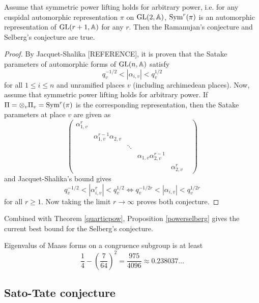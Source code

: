 \begin{proposition}
\label{powerselberg}
Assume that symmetric power lifting holds for arbitrary power, i.e. for any cuspidal automorphic representation $\pi$ on $\operatorname{\mathrm{GL}}(2,\mathbb{A})$,  $\mathrm{Sym}^{r}(\pi)$ is an automorphic representation of $\operatorname{\mathrm{GL}}(r + 1, \mathbb{A})$ for any $r$.
Then the Ramanujan's conjecture and Selberg's conjecture are true.
\end{proposition}
\begin{proof}
By Jacquet-Shalika [REFERENCE], it is proven that the Satake parameters of automorphic forms of $\operatorname{\mathrm{GL}}(n, \mathbb{A})$ satisfy 
$$
q_{v}^{-1/2} < |\alpha_{i,v}| < q_{v}^{1/2}
$$
for all $1\leq i\leq n$ and unramified places $v$ (including archimedean places).
Now, assume that symmetric power lifting holds for arbitrary power. 
If $\Pi = \otimes_{v}\Pi_{v} = \mathrm{Sym}^{r}(\pi)$ is the corresponding representation, then the Satake parameters at place $v$ are given as
$$
\begin{pmatrix}
\alpha_{1, v}^{r} & & & & \\ 
& \alpha_{1, v}^{r-1}\alpha_{2, v} & & & \\ 
& & \ddots & & & \\
& & & \alpha_{1, v}\alpha_{2, v}^{r-1} & \\
& & & & \alpha_{2, v}^{r}
\end{pmatrix}
$$
and Jacquet-Shalika's bound gives 
$$
q_{v}^{-1/2} < |\alpha_{i, v}^{r}| < q_{v}^{1/2} \Longleftrightarrow q_{v}^{-1/2r} < |\alpha_{i, v}| < q_{v}^{1/2r}
$$
for all $r\geq 1$. Now taking the limit $r\to \infty$ proves both conjecture.
\end{proof}

Combined with Theorem \ref{quarticpow}, Proposition \ref{powerselberg} gives the current best bound for the Selberg's conjecture.

\begin{corollary}
Eigenvalus of Maass forms on a congruence subgroup is at least 
$$
\frac{1}{4} - \left(\frac{7}{64}\right)^{2} = \frac{975}{4096} \approx 0.238037\dots
$$
\end{corollary}

\subsection{Sato-Tate conjecture}

